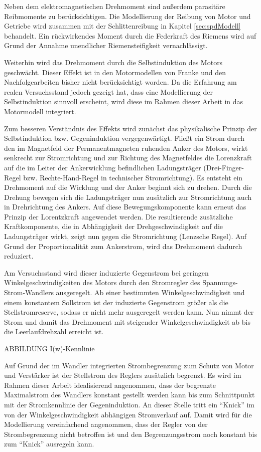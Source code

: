 Neben dem elektromagnetischen Drehmoment sind außerdem parasitäre Reibmomente zu berücksichtigen. Die Modellierung der Reibung von Motor und Getriebe wird zusammen mit der Schlittenreibung in Kapitel \ref{sec:spdModell} behandelt. Ein rückwirkendes Moment durch die Federkraft des Riemens wird auf Grund der Annahme unendlicher Riemensteifigkeit vernachlässigt. 

Weiterhin wird das Drehmoment durch die Selbstinduktion des Motors geschwächt. Dieser Effekt ist in den Motormodellen von Franke \cite{franke} und den Nachfolgearbeiten bisher nicht berücksichtigt worden. Da die Erfahrung am realen Versuchsstand jedoch gezeigt hat, dass eine Modellierung der Selbstinduktion sinnvoll erscheint, wird diese im Rahmen dieser Arbeit in das Motormodell integriert.

Zum besseren Verständnis des Effekts wird zunächst das physikalische Prinzip der Selbstinduktion bzw. Gegeninduktion vergegenwärtigt. Fließt ein Strom durch den im Magnetfeld der Permanentmagneten ruhenden Anker des Motors, wirkt senkrecht zur Stromrichtung und zur Richtung des Magnetfeldes die Lorenzkraft auf die im Leiter der Ankerwicklung befindlichen Ladungsträger (Drei-Finger-Regel bzw. Rechte-Hand-Regel in technischer Stromrichtung). Es entsteht ein Drehmoment auf die Wicklung und der Anker beginnt sich zu drehen. Durch die Drehung bewegen sich die Ladungsträger nun zusätzlich zur Stromrichtung auch in Drehrichtung des Ankers. Auf diese Bewegungskomponente kann erneut das Prinzip der Lorentzkraft angewendet werden. Die resultierende zusätzliche Kraftkomponente, die in Abhängigkeit der Drehgeschwindigkeit auf die Ladungsträger wirkt, zeigt nun gegen die Stromrichtung (Lenzsche Regel). Auf Grund der Proportionalität zum Ankerstrom, wird das Drehmoment dadurch reduziert. 

Am Versuchsstand wird dieser induzierte Gegenstrom bei geringen Winkelgeschwindigkeiten des Motors durch den Stromregler des Spannungs-Strom-Wandlers ausgeregelt. Ab einer bestimmten Winkelgeschwindigkeit und einem konstantem Sollstrom ist der induzierte Gegenstrom größer als die Stellstromreserve, sodass er nicht mehr ausgeregelt werden kann. Nun nimmt der Strom und damit das Drehmoment mit steigender Winkelgeschwindigkeit ab bis die Leerlaufdrehzahl erreicht ist. 

ABBILDUNG I(w)-Kennlinie

Auf Grund der im Wandler integrierten Strombegrenzung zum Schutz von Motor und Verstärker ist der Stellstrom des Reglers zusätzlich begrenzt. Es wird im Rahmen dieser Arbeit idealisierend angenommen, dass der begrenzte Maximalstrom des Wandlers konstant gestellt werden kann bis zum Schnittpunkt mit der Stromkennlinie der Gegeninduktion. An dieser Stelle tritt ein "`Knick"' im von der Winkelgeschwindigkeit abhängigen Stromverlauf auf. Damit wird für die Modellierung vereinfachend angenommen, dass der Regler von der Strombegrenzung nicht betroffen ist und den Begrenzungsstrom noch konstant bis zum "`Knick"' ausregeln kann.

